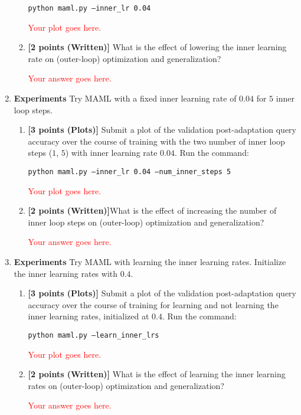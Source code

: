 \documentclass[12pt]{article}
\begin{document}
\begin{enumerate}
\begin{enumerate}[label=(\alph*)]
        \texttt{python maml.py --inner\_lr 0.04}
        
        \textcolor{red}{Your plot goes here.}


        \item \textbf{[2 points (Written)]} What is the effect of lowering the inner learning rate on (outer-loop) optimization and generalization?

        \textcolor{red}{Your answer goes here.}

    \end{enumerate}
    
    \newpage
    \item \textbf{Experiments} Try MAML with a fixed inner learning rate of $0.04$ for $5$ inner loop steps.
    \begin{enumerate}[label=(\alph*)]
        \item\textbf{[3 points (Plots)]} Submit a plot of the validation post-adaptation query accuracy over the course of training with the two number of inner loop steps ($1$, $5$) with inner learning rate $0.04$. Run the command:

        \texttt{python maml.py --inner\_lr 0.04 --num\_inner\_steps 5}
  
        \textcolor{red}{Your plot goes here.}

        \item\textbf{[2 points (Written)]}What is the effect of increasing the number of inner loop steps on (outer-loop) optimization and generalization?
        
        \textcolor{red}{Your answer goes here.}

    \end{enumerate}

    \newpage
    \item \textbf{Experiments} Try MAML with learning the inner learning rates. Initialize the inner learning rates with $0.4$.
    \begin{enumerate}[label=(\alph*)]
        \item\textbf{[3 points (Plots)]} Submit a plot of the validation post-adaptation query accuracy over the course of training for learning and not learning the inner learning rates, initialized at $0.4$. Run the command:

        \texttt{python maml.py --learn\_inner\_lrs}
        
        \textcolor{red}{Your plot goes here.}

        \item \textbf{[2 points (Written)]} What is the effect of learning the inner learning rates on (outer-loop) optimization and generalization?

        \textcolor{red}{Your answer goes here.}

    \end{enumerate}
\end{enumerate}
\end{document}
